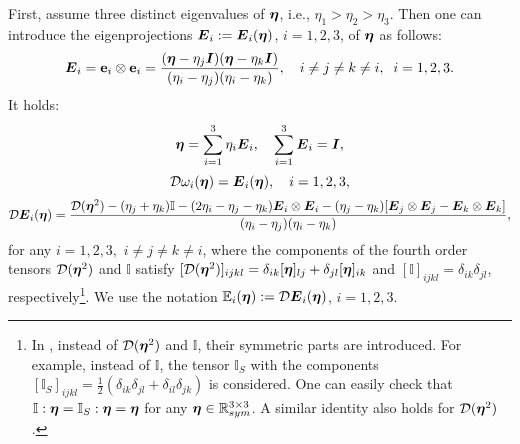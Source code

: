 \documentclass[a4paper,12pt]{article}
\theoremstyle{remark}
\newcommand{\mbf}[1]{\mbox{\boldmath$#1$}}
\numberwithin{equation}{section}
\begin{document}
First, assume three distinct eigenvalues of $\mbf\eta$, i.e., $\eta_1> \eta_2> \eta_3$. Then one can introduce the eigenprojections $\mbf E_i:=\mbf E_i(\mbf\eta)$, $i=1,2,3$, of $\mbf\eta$ as follows:
\begin{equation}
\mbf E_i=\mathbf e_i\otimes\mathbf e_i=\frac{(\mbf\eta-\eta_j\mbf I)(\mbf\eta-\eta_k\mbf I)}{(\eta_i-\eta_j)(\eta_i-\eta_k)},\quad i\neq j\neq k\neq i,\;\; i=1,2,3.
\label{eigenprojection_case1}
\end{equation}
It holds:
\begin{equation}
\mbf\eta=\sum_{i=1}^3\eta_i\mbf E_i,\quad \sum_{i=1}^3\mbf E_i=\mbf I,
\label{eigen_prop}
\end{equation}
\begin{equation}
\mathcal D\omega_i(\mbf\eta)=\mbf E_i(\mbf\eta),\quad i=1,2,3,
\label{der_eigen_case1}
\end{equation}
\begin{equation}
\mathcal D\mbf E_i(\mbf\eta)=\frac{\mathcal D(\mbf\eta^2)-(\eta_j+\eta_k)\mathbb I-(2\eta_i-\eta_j-\eta_k)\mbf E_i\otimes\mbf E_i-(\eta_j-\eta_k)[\mbf E_j\otimes\mbf E_j-\mbf E_k\otimes\mbf E_k]}{(\eta_i-\eta_j)(\eta_i-\eta_k)},
\label{E_deriv_case1}
\end{equation}
for any $i=1,2,3,$ $i\neq j\neq k\neq i$, where the components of the fourth order tensors $\mathcal D(\mbf\eta^2)$ and $\mathbb I$ satisfy
$[\mathcal D(\mbf\eta^2)]_{ijkl}=\delta_{ik}[\mbf\eta]_{lj}+\delta_{jl}[\mbf\eta]_{ik}$ and $[\mathbb I]_{ijkl}=\delta_{ik}\delta_{jl}$, respectively\footnote{In \cite[Appendix A]{NPO08}, instead of $\mathcal D(\mbf\eta^2)$ and $\mathbb I$, their symmetric parts are introduced. For example, instead of $\mathbb I$, the tensor $\mathbb I_S$ with the components $[\mathbb I_S]_{ijkl}=\frac{1}{2}(\delta_{ik}\delta_{jl}+\delta_{il}\delta_{jk})$ is considered. One can easily check that $\mathbb I:\mbf\eta=\mathbb I_S:\mbf\eta=\mbf\eta$ for any $\mbf\eta\in\mathbb R^{3\times 3}_{sym}$. A similar identity also holds for $\mathcal D(\mbf\eta^2)$.}.
We use the notation $\mathbb E_i(\mbf\eta):=\mathcal D\mbf E_i(\mbf\eta)$,  $i=1,2,3$. 
\end{document}
